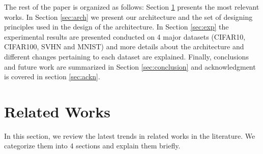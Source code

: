 \documentclass{article} \usepackage{lets_keepit_simple,times}
\begin{document}
The rest of the paper is organized as follows: Section \ref{sec:related} presents the most relevant works. In Section \ref{sec:arch} we present our architecture and the set of designing principles used in the design of the architecture. In Section \ref{sec:exp} the experimental results are presented conducted on 4 major datasets (CIFAR10, CIFAR100, SVHN and MNIST) and more details about the architecture and different changes pertaining to each dataset are explained. Finally, conclusions and future work are summarized in Section \ref{sec:conclusion} and acknowledgment is covered in section \ref{sec:ackn}.
\section{Related Works} \label{sec:related}
In this section, we review the latest trends in related works in the literature. We categorize them into 4 sections and explain them briefly. 
\end{document}
